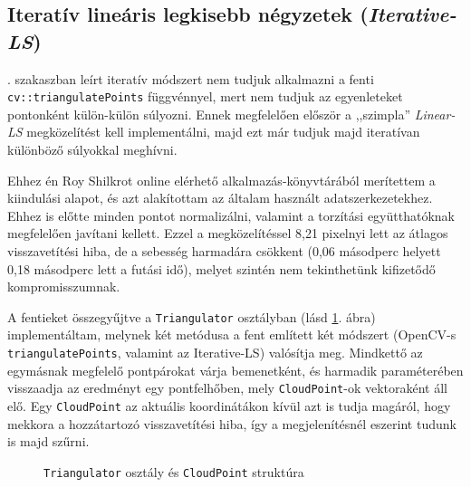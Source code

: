 \subsection{Iteratív lineáris legkisebb négyzetek (\textit{Iterative-LS})}

. szakaszban leírt iteratív módszert nem tudjuk alkalmazni a fenti \texttt{cv::triangulatePoints} függvénnyel, mert nem tudjuk az egyenleteket pontonként külön-külön súlyozni. Ennek megfelelően először a ,,szimpla'' \textit{Linear-LS} megközelítést kell implementálni, majd ezt már tudjuk majd iteratívan különböző súlyokkal meghívni.

Ehhez én Roy Shilkrot online elérhető alkalmazás-könyvtárából \cite{sfm-toy-library} merítettem a kiindulási alapot, és azt alakítottam az általam használt adatszerkezetekhez. Ehhez is előtte minden pontot normalizálni, valamint a torzítási együtthatóknak megfelelően javítani kellett. Ezzel a megközelítéssel 8,21 pixelnyi lett az átlagos visszavetítési hiba, de a sebesség harmadára csökkent (0,06 másodperc helyett 0,18 másodperc lett a futási idő), melyet szintén nem tekinthetünk kifizetődő kompromisszumnak.

A fentieket összegyűjtve a \texttt{Triangulator} osztályban (lásd \ref{fig:cd:triangulator}. ábra) implementáltam, melynek két metódusa a fent említett két módszert (OpenCV-s \texttt{triangulatePoints}, valamint az Iterative-LS) valósítja meg. Mindkettő az egymásnak megfelelő pontpárokat várja bemenetként, és harmadik paraméterében visszaadja az eredményt egy pontfelhőben, mely \texttt{CloudPoint}-ok vektoraként áll elő. Egy \texttt{CloudPoint} az aktuális koordinátákon kívül azt is tudja magáról, hogy mekkora a hozzátartozó visszavetítési hiba, így a megjelenítésnél eszerint tudunk is majd szűrni.

\begin{figure}[tbh]
\centering


\caption{\texttt{Triangulator} osztály és \texttt{CloudPoint} struktúra \label{fig:cd:triangulator}}
\end{figure}


